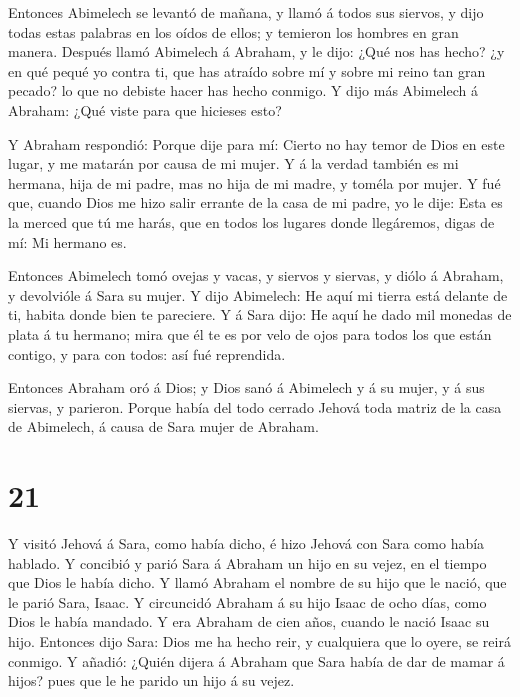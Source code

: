  Entonces Abimelech se levantó de mañana, y llamó á todos
sus siervos, y dijo todas estas palabras en los oídos de ellos; y
temieron los hombres en gran manera.  Después llamó
Abimelech á Abraham, y le dijo: ¿Qué nos has hecho? ¿y en qué pequé yo
contra ti, que has atraído sobre mí y sobre mi reino tan gran pecado? lo
que no debiste hacer has hecho conmigo.  Y dijo más
Abimelech á Abraham: ¿Qué viste para que hicieses esto?

 Y Abraham respondió: Porque dije para mí: Cierto no hay
temor de Dios en este lugar, y me matarán por causa de mi mujer.
 Y á la verdad también es mi hermana, hija de mi padre, mas
no hija de mi madre, y toméla por mujer.  Y fué que, cuando
Dios me hizo salir errante de la casa de mi padre, yo le dije: Esta es
la merced que tú me harás, que en todos los lugares donde llegáremos,
digas de mí: Mi hermano es.

 Entonces Abimelech tomó ovejas y vacas, y siervos y
siervas, y diólo á Abraham, y devolvióle á Sara su mujer. 
Y dijo Abimelech: He aquí mi tierra está delante de ti, habita donde
bien te pareciere.  Y á Sara dijo: He aquí he dado mil
monedas de plata á tu hermano; mira que él te es por velo de ojos para
todos los que están contigo, y para con todos: así fué reprendida.

 Entonces Abraham oró á Dios; y Dios sanó á Abimelech y á
su mujer, y á sus siervas, y parieron.  Porque había del
todo cerrado Jehová toda matriz de la casa de Abimelech, á causa de Sara
mujer de Abraham.

\hypertarget{section-20}{%
\section{21}\label{section-20}}

 Y visitó Jehová á Sara, como había dicho, é hizo Jehová con
Sara como había hablado.  Y concibió y parió Sara á Abraham
un hijo en su vejez, en el tiempo que Dios le había dicho. 
Y llamó Abraham el nombre de su hijo que le nació, que le parió Sara,
Isaac.  Y circuncidó Abraham á su hijo Isaac de ocho días,
como Dios le había mandado.  Y era Abraham de cien años,
cuando le nació Isaac su hijo.  Entonces dijo Sara: Dios me
ha hecho reir, y cualquiera que lo oyere, se reirá conmigo. 
Y añadió: ¿Quién dijera á Abraham que Sara había de dar de mamar á
hijos? pues que le he parido un hijo á su vejez.

